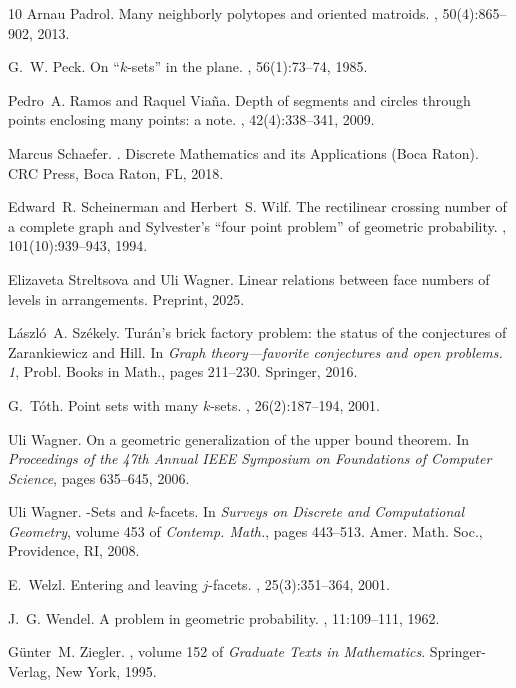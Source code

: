 \documentclass[11pt]{article}
\begin{document}
\begin{thebibliography}{10}
Arnau Padrol.
\newblock Many neighborly polytopes and oriented matroids.
, 50(4):865--902, 2013.

G.~W. Peck.
\newblock On ``{$k$}-sets'' in the plane.
, 56(1):73--74, 1985.

Pedro~A. Ramos and Raquel Via\~{n}a.
\newblock Depth of segments and circles through points enclosing many points: a
  note.
, 42(4):338--341, 2009.

Marcus Schaefer.
.
\newblock Discrete Mathematics and its Applications (Boca Raton). CRC Press,
  Boca Raton, FL, 2018.

Edward~R. Scheinerman and Herbert~S. Wilf.
\newblock The rectilinear crossing number of a complete graph and {S}ylvester's
  ``four point problem'' of geometric probability.
, 101(10):939--943, 1994.

Elizaveta Streltsova and Uli Wagner.
\newblock Linear relations between face numbers of levels in arrangements.
\newblock Preprint, 2025.

L\'{a}szl\'{o}~A. Sz\'{e}kely.
\newblock Tur\'{a}n's brick factory problem: the status of the conjectures of
  {Z}arankiewicz and {H}ill.
\newblock In {\em Graph theory---favorite conjectures and open problems. 1},
  Probl. Books in Math., pages 211--230. Springer, 2016.

G.~T\'{o}th.
\newblock Point sets with many {$k$}-sets.
, 26(2):187--194, 2001.

Uli Wagner.
\newblock On a geometric generalization of the upper bound theorem.
\newblock In {\em Proceedings of the 47th Annual IEEE Symposium on Foundations
  of Computer Science}, pages 635--645, 2006.

Uli Wagner.
-{S}ets and {$k$}-facets.
\newblock In {\em Surveys on {D}iscrete and {C}omputational {G}eometry}, volume
  453 of {\em Contemp. Math.}, pages 443--513. Amer. Math. Soc., Providence,
  RI, 2008.

E.~Welzl.
\newblock Entering and leaving {$j$}-facets.
, 25(3):351--364, 2001.

J.~G. Wendel.
\newblock A problem in geometric probability.
, 11:109--111, 1962.

G\"{u}nter~M. Ziegler.
, volume 152 of {\em Graduate Texts in
  Mathematics}.
\newblock Springer-Verlag, New York, 1995.

\end{thebibliography}
\end{document}
